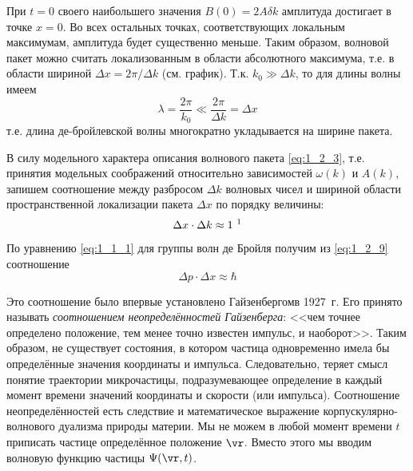 При $t = 0$ своего наибольшего значения $B(0) = 2A \delta k$ амплитуда достигает в точке $x = 0$. Во всех остальных точках, соответствующих локальным максимумам, амплитуда будет существенно меньше. Таким образом, волновой пакет можно считать локализованным в области абсолютного максимума, т.е. в области шириной $\Delta x = 2\pi / \Delta k$ (см. график). Т.к. $k_0 \gg \Delta k$, то для длины волны имеем
$$
\lambda = \frac{2 \pi}{k_0} \ll \frac{2 \pi}{\Delta k} = \Delta x
$$%
%
т.е. длина де-бройлевской волны многократно укладывается на ширине пакета.

В силу модельного характера описания волнового пакета \eqref{eq:1_2_3}, т.е. принятия модельных соображений относительно зависимостей $\omega(k)$ и $A(k)$, запишем соотношение между разбросом $\Delta k$ волновых чисел и шириной области пространственной локализации пакета $\Delta x$ по порядку величины:
\begin{equation}
\label{eq:1_2_9}
\Delta x \cdot \Delta k \approx 1 ~\text{\footnotemark}
\end{equation}


По уравнению \eqref{eq:1_1_1} для группы волн де Бройля получим из \eqref{eq:1_2_9} соотношение
\begin{equation}
\label{eq:1_2_10}
\boxed{\Delta p \cdot \Delta x \approx \hbar}
\end{equation}

Это соотношение было впервые установлено Гайзенбергом\footnotemark в 1927~г. Его принято называть {\em соотношением неопределённостей Гайзенберга}: <<чем точнее определено положение, тем менее точно известен импульс, и наоборот>>. Таким образом, не существует состояния, в котором частица одновременно имела бы определённые значения координаты и импульса. Следовательно, теряет смысл понятие траектории микрочастицы, подразумевающее определение в каждый момент времени значений координаты и скорости (или импульса). Соотношение неопределённостей есть следствие и математическое выражение корпускулярно-волнового дуализма природы материи. Мы не можем в любой момент времени $t$ приписать частице определённое положение $\vr$. Вместо этого мы вводим волновую функцию частицы $\Psi(\vr, t)$.



